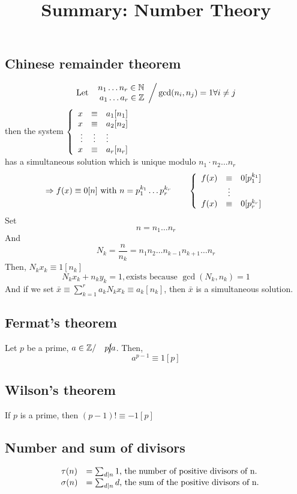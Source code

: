 \documentclass{report}
\title{Summary: Number Theory}
\begin{document}
\newtheorem*{defi}{Definition}
\newtheorem*{thm}{Theorem}
\subsection*{Chinese remainder theorem}
\[ 
\text{Let  }
\left.
\begin{array}{r c l}
n_1 \dots n_r \in \mathbb{N}\\
a_1 \dots a_r \in \mathbb{Z}\\
\end{array}
\right/ \gcd(n_i,n_j)=1 \forall i \neq j
\]
then the  system
$
\left \{
\begin{array}{r c l}
x &\equiv& a_1[n_1]\\
x &\equiv& a_2[n_2]\\
\vdots &\vdots& \vdots\\
x &\equiv& a_r[n_r]\\
\end{array}
\right.
$ \\
has a simultaneous solution which is unique modulo $n_1 \cdot n_2 \dots n_r$
\[
\Rightarrow f(x) \equiv 0[n] \text{ with  } n = p_1^{k_1} \dots p_r^{k_r} \qquad 
\left \{
\begin{array}{r c l}
f(x) &\equiv& 0[p_1^{k_1}]\\
&\vdots&\\
f(x) &\equiv& 0[p_r^{k_r}]\\
\end{array}
\right.
\]
Set 
\[
n=n_1 \dots n_r
\]
And
\[
N_k=\frac{n}{n_k}=n_1 n_2 \dots n_{k-1} n_{k+1} \dots n_r
\]
Then, $N_k x_k \equiv 1 [n_k]$\\
\[
N_k x_k + n_k y_k = 1, \text{exists because } \gcd(N_k, n_k)=1
\]
And if we set $\bar{x} \equiv \sum_{k=1}^{r}a_k N_k x_k \equiv a_k [n_k]$, then $\bar{x}$ is a simultaneous solution.\\

\subsection*{Fermat's theorem}
Let $p$ be a prime, $a \in \mathbb{Z} / \quad p \cancel{\mid} a$. Then,
\[ a^{p-1} \equiv 1 [p] \]

\subsection*{Wilson's theorem}
If $p$ is a prime, then $(p-1)! \equiv -1[p]$

\subsection*{Number and sum of divisors}
\[
\begin{array}{l c l}
&\tau(n)& = \sum_{d \mid n}1 \text{,   the number of positive divisors of n.}\\
&\sigma(n)&= \sum_{d \mid n}d \text{,   the sum of the positive divisors of n.}\\
\end{array}
\]
\end{document}
